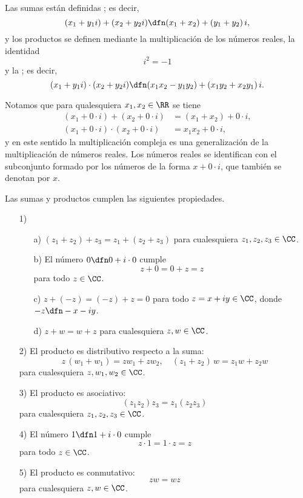 Las sumas están definidas ; es decir,
$$(x_1 + y_1 i) + (x_2 + y_2 i) \dfn (x_1+x_2) + (y_1+y_2)\,i,$$
y los productos se definen mediante la multiplicación de los números reales,
la identidad
$$i^2 = -1$$
y la ; es decir,
$$(x_1 + y_1 i) \cdot (x_2 + y_2 i) \dfn (x_1 x_2 - y_1 y_2) + (x_1 y_2 + x_2 y_1)\,i.$$

Notamos que para qualesquiera $x_1,x_2 \in \RR$ se tiene
\begin{align*}
  (x_1 + 0\cdot i) + (x_2 + 0\cdot i) & = (x_1 + x_2) + 0\cdot i,\\
  (x_1 + 0\cdot i)\cdot (x_2 + 0\cdot i) & = x_1 x_2 + 0\cdot i,
\end{align*}
y en este sentido la multiplicación compleja es una generalización
de la multiplicación de números reales. Los números reales se identifican con
el subconjunto formado por los números de la forma $x + 0\cdot i$, que también
se denotan por $x$.

\begin{observacionejerc}
  \label{obs:los-complejos-forman-un-anillo}
  Las sumas y productos cumplen las siguientes propiedades.

  \begin{enumerate}
  \item[1)]
    \begin{itemize}
    \item[a)] $(z_1+z_2) + z_3 = z_1 + (z_2+z_3)$ para cualesquiera
      $z_1,z_2,z_3 \in \CC$.

    \item[b)] El número $0 \dfn 0 + i\cdot 0$ cumple
      $$z + 0 = 0 + z = z$$
      para todo $z\in \CC$.

    \item[c)] $z + (-z) = (-z) + z = 0$ para todo $z = x+iy \in \CC$, donde
      $-z \dfn -x - iy$.

    \item[d)] $z+w = w+z$ para cualesquiera $z,w\in \CC$.
    \end{itemize}

  \item[2)] El producto es distributivo respecto a la suma:
    $$z\,(w_1 + w_1) = z w_1 + z w_2, \quad (z_1 + z_2)\,w = z_1 w + z_2 w$$
    para cualesquiera $z,w_1,w_2 \in \CC$.

  \item[3)] El producto es asociativo:
    $$(z_1 z_2) z_3 = z_1 (z_2 z_3)$$
    para cualesquiera $z_1,z_2,z_3 \in \CC$.

  \item[4)] El número $1 \dfn 1 + i\cdot 0$ cumple
    $$z\cdot 1 = 1\cdot z = z$$
    para todo $z\in \CC$.

  \item[5)] El producto es conmutativo:
    $$zw = wz$$
    para cualesquiera $z,w\in \CC$. \qedhere
  \end{enumerate}
\end{observacionejerc}

